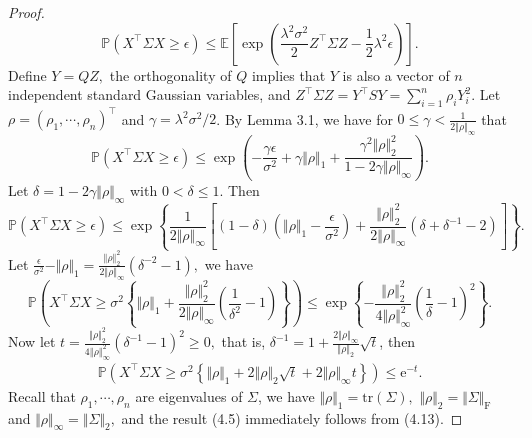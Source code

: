\documentclass{article}
\newcommand{\E}{\mathbb{E}}
\begin{document}
\begin{proof}
\begin{equation*}
	\mathbb{P}(X^\top\Sigma X\geq \epsilon) \leq \E\left[\exp\left(\frac{\lambda^2\sigma^2}{2}Z^\top\Sigma Z - \frac{1}{2}\lambda^2\epsilon\right)\right].\tag{4.9}
\end{equation*}
Define $Y=QZ,$ the orthogonality of $Q$ implies that $Y$ is also a vector of $n$ independent standard Gaussian variables, and $Z^\top\Sigma Z = Y^\top SY = \sum_{i=1}^n \rho_iY_i^2.$ Let $\rho = (\rho_1,\cdots,\rho_n)^\top$ and $\gamma = \lambda^2\sigma^2/2$. By Lemma 3.1, we have for $0\leq\gamma < \frac{1}{2\Vert\rho\Vert_\infty}$ that
\begin{equation*}
	\mathbb{P}(X^\top\Sigma X\geq \epsilon) \leq \exp\left(-\frac{\gamma\epsilon}{\sigma^2} + \gamma\Vert\rho\Vert_1 + \frac{\gamma^2\Vert\rho\Vert_2^2}{1-2\gamma\Vert\rho\Vert_\infty}\right).\tag{4.10}
\end{equation*}
Let $\delta = 1-2\gamma\Vert\rho\Vert_\infty$ with $0 < \delta \leq 1.$ Then
\begin{equation*}
	\mathbb{P}(X^\top\Sigma X\geq \epsilon) \leq \exp\left\{\frac{1}{2\Vert\rho\Vert_\infty}\left[(1-\delta)\left(\Vert\rho\Vert_1- \frac{\epsilon}{\sigma^2}\right) + \frac{\Vert\rho\Vert_2^2}{2\Vert\rho\Vert_\infty}\left(\delta + \delta^{-1} - 2\right)\right]\right\}.\tag{4.11}
\end{equation*}
Let $\frac{\epsilon}{\sigma^2} - \Vert\rho\Vert_1 = \frac{\Vert\rho\Vert_2^2}{2\Vert\rho\Vert_\infty}(\delta^{-2}-1),$ we have
\begin{equation*}
	\mathbb{P}\left(X^\top\Sigma X\geq \sigma^2\left\{\Vert\rho\Vert_1 + \frac{\Vert\rho\Vert_2^2}{2\Vert\rho\Vert_\infty}\left(\frac{1}{\delta^2}-1\right)\right\}\right) \leq \exp\left\{-\frac{\Vert\rho\Vert_2^2}{4\Vert\rho\Vert_\infty^2}\left(\frac{1}{\delta}-1\right)^2\right\}.\tag{4.12}
\end{equation*}
Now let $t=\frac{\Vert\rho\Vert_2^2}{4\Vert\rho\Vert_\infty^2}\left( \delta^{-1} - 1\right)^{2} \geq 0,$ that is, $\delta^{-1} = 1 + \frac{2\Vert\rho\Vert_\infty}{\Vert\rho\Vert_2}\sqrt{t}$, then
\begin{align*}
	\mathbb{P}\left(X^\top\Sigma X\geq \sigma^2\left\{\Vert\rho\Vert_1 + 2\Vert\rho\Vert_2\sqrt{t} + 2\Vert\rho\Vert_\infty t\right\}\right)\leq\mathrm{e}^{-t}.\tag{4.13}
\end{align*}
Recall that $\rho_1,\cdots,\rho_n$ are eigenvalues of $\Sigma$, we have $\Vert\rho\Vert_1 = \mathrm{tr}(\Sigma),$ $\Vert\rho\Vert_2 = \Vert\Sigma\Vert_\mathrm{F}$ and $\Vert\rho\Vert_\infty = \Vert\Sigma\Vert_2,$ and the result (4.5) immediately follows from (4.13).
\end{proof}
\end{document}
